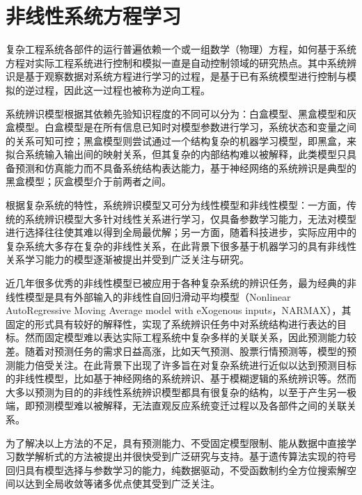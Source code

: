 \section{非线性系统方程学习}
\label{sec:sr-review}

复杂工程系统各部件的运行普遍依赖一个或一组数学（物理）方程，如何基于系统方程对实际工程系统进行控制和模拟一直是自动控制领域的研究热点。其中系统辨识是基于观察数据对系统方程进行学习的过程，是基于已有系统模型进行控制与模拟的逆过程，因此这一过程也被称为逆向工程\cite{bongard2007automated}。

系统辨识模型根据其依赖先验知识程度的不同可以分为：白盒模型、黑盒模型和灰盒模型\cite{giustolisi2004using}。白盒模型是在所有信息已知时对模型参数进行学习，系统状态和变量之间的关系可知可控；黑盒模型则尝试通过一个结构复杂的机器学习模型，即黑盒，来拟合系统输入输出间的映射关系，但其复杂的内部结构难以被解释，此类模型只具备预测和仿真能力而不具备系统结构表达能力，基于神经网络的系统辨识是典型的黑盒模型；灰盒模型介于前两者之间。

根据复杂系统的特性，系统辨识模型又可分为线性模型和非线性模型\cite{giannakis2001bibliography}：一方面，传统的系统辨识模型大多针对线性关系进行学习，仅具备参数学习能力，无法对模型进行选择往往使其难以得到全局最优解；另一方面，随着科技进步，实际应用中的复杂系统大多存在复杂的非线性关系，在此背景下很多基于机器学习的具有非线性关系学习能力的模型逐渐被提出并受到广泛关注与研究。

近几年很多优秀的非线性模型已被应用于各种复杂系统的辨识任务\cite{giannakis2001bibliography}，最为经典的非线性模型是具有外部输入的非线性自回归滑动平均模型（Nonlinear AutoRegressive Moving Average model with eXogenous inputs，NARMAX），其固定的形式具有较好的解释性，实现了系统辨识任务中对系统结构进行表达的目标。然而固定模型难以表达实际工程系统中复杂多样的关联关系，因此预测能力较差。随着对预测任务的需求日益高涨，比如天气预测、股票行情预测等，模型的预测能力倍受关注。在此背景下出现了许多旨在对复杂系统进行近似以达到预测目标的非线性模型，比如基于神经网络的系统辨识、基于模糊逻辑的系统辨识等。然而大多以预测为目的的非线性系统辨识模型都具有很复杂的结构，以至于产生另一极端，即预测模型难以被解释，无法直观反应系统变迁过程以及各部件之间的关联关系。

为了解决以上方法的不足，具有预测能力、不受固定模型限制、能从数据中直接学习数学解析式的方法被提出并很快受到广泛研究与支持\cite{schmidt2009distilling,daniels2015automated}。基于遗传算法实现的符号回归具有模型选择与参数学习的能力，纯数据驱动，不受函数制约全方位搜索解空间以达到全局收敛等诸多优点使其受到广泛关注\cite{koza1994genetic}。

